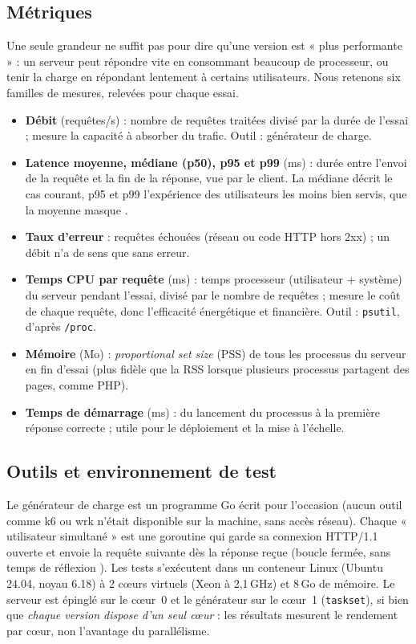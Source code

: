 \subsection{Métriques}
Une seule grandeur ne suffit pas pour dire qu'une version est « plus performante » : un serveur peut répondre vite
en consommant beaucoup de processeur, ou tenir la charge en répondant lentement à certains utilisateurs. Nous
retenons six familles de mesures, relevées pour chaque essai.
\begin{itemize}[leftmargin=*,itemsep=0pt,topsep=2pt]
\item \textbf{Débit} (requêtes/s) : nombre de requêtes traitées divisé par la durée de l'essai ; mesure la capacité
à absorber du trafic. Outil : générateur de charge.
\item \textbf{Latence moyenne, médiane (p50), p95 et p99} (ms) : durée entre l'envoi de la requête et la fin de la
réponse, vue par le client. La médiane décrit le cas courant, p95 et p99 l'expérience des utilisateurs les moins
bien servis, que la moyenne masque \cite{dean2013}.
\item \textbf{Taux d'erreur} : requêtes échouées (réseau ou code HTTP hors 2xx) ; un débit n'a de sens que sans erreur.
\item \textbf{Temps CPU par requête} (ms) : temps processeur (utilisateur + système) du serveur pendant l'essai,
divisé par le nombre de requêtes ; mesure le coût de chaque requête, donc l'efficacité énergétique et financière.
Outil : \texttt{psutil}, d'après \texttt{/proc}.
\item \textbf{Mémoire} (Mo) : \textit{proportional set size} (PSS) de tous les processus du serveur en fin d'essai
(plus fidèle que la RSS lorsque plusieurs processus partagent des pages, comme PHP).
\item \textbf{Temps de démarrage} (ms) : du lancement du processus à la première réponse correcte ; utile pour
le déploiement et la mise à l'échelle.
\end{itemize}

\subsection{Outils et environnement de test}
Le générateur de charge est un programme Go écrit pour l'occasion (aucun outil comme k6 ou wrk n'était disponible
sur la machine, sans accès réseau). Chaque « utilisateur simultané » est une goroutine qui garde sa connexion HTTP/1.1
ouverte et envoie la requête suivante dès la réponse reçue (boucle fermée, sans temps de réflexion \cite{jain1991}). Les tests
s'exécutent dans un conteneur Linux (Ubuntu 24.04, noyau 6.18) à 2 cœurs virtuels (Xeon à 2,1\,GHz) et 8\,Go de
mémoire. Le serveur est épinglé sur le cœur~0 et le générateur sur le cœur~1 (\texttt{taskset}), si bien que
\emph{chaque version dispose d'un seul cœur} : les résultats mesurent le rendement par cœur, non l'avantage du
parallélisme.

